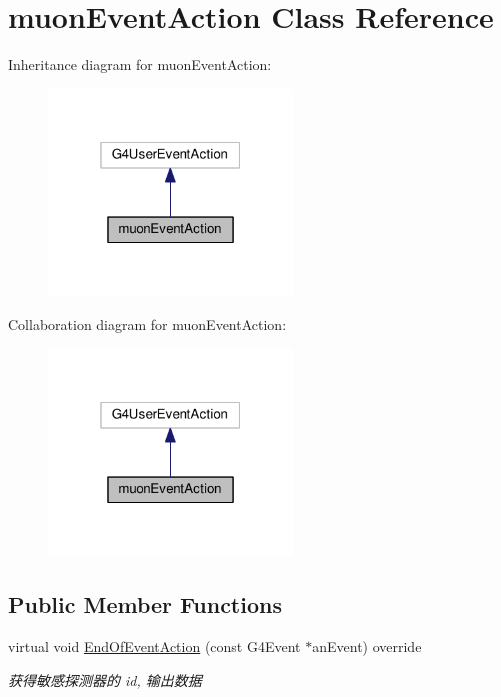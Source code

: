 \hypertarget{classmuonEventAction}{}\section{muon\+Event\+Action Class Reference}
\label{classmuonEventAction}


Inheritance diagram for muon\+Event\+Action\+:\nopagebreak
\begin{figure}[H]
\begin{center}
\leavevmode
\includegraphics[width=184pt]{classmuonEventAction__inherit__graph}
\end{center}
\end{figure}


Collaboration diagram for muon\+Event\+Action\+:\nopagebreak
\begin{figure}[H]
\begin{center}
\leavevmode
\includegraphics[width=184pt]{classmuonEventAction__coll__graph}
\end{center}
\end{figure}
\subsection*{Public Member Functions}
\begin{DoxyCompactItemize}
\item 
virtual void \hyperlink{classmuonEventAction_a674e82851a04669f19294aae5e4a69e6}{End\+Of\+Event\+Action} (const G4\+Event $\ast$an\+Event) override
\begin{DoxyCompactList}\small\item\em 获得敏感探测器的 id, 输出数据 \end{DoxyCompactList}\end{DoxyCompactItemize}


